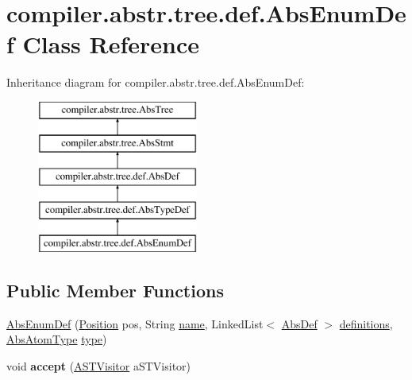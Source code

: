 \hypertarget{classcompiler_1_1abstr_1_1tree_1_1def_1_1_abs_enum_def}{}\section{compiler.\+abstr.\+tree.\+def.\+Abs\+Enum\+Def Class Reference}
\label{classcompiler_1_1abstr_1_1tree_1_1def_1_1_abs_enum_def}
Inheritance diagram for compiler.\+abstr.\+tree.\+def.\+Abs\+Enum\+Def\+:\begin{figure}[H]
\begin{center}
\leavevmode
\includegraphics[height=5.000000cm]{classcompiler_1_1abstr_1_1tree_1_1def_1_1_abs_enum_def}
\end{center}
\end{figure}
\subsection*{Public Member Functions}
\begin{DoxyCompactItemize}
\item 
\hyperlink{classcompiler_1_1abstr_1_1tree_1_1def_1_1_abs_enum_def_abe0f9c331bc6c3a3c8caf5b2162380c4}{Abs\+Enum\+Def} (\hyperlink{classcompiler_1_1_position}{Position} pos, String \hyperlink{classcompiler_1_1abstr_1_1tree_1_1def_1_1_abs_def_ac6bda9377f5abbb5f1be7d3d1b16481b}{name}, Linked\+List$<$ \hyperlink{classcompiler_1_1abstr_1_1tree_1_1def_1_1_abs_def}{Abs\+Def} $>$ \hyperlink{classcompiler_1_1abstr_1_1tree_1_1def_1_1_abs_enum_def_ab0e83a0d165a93b4acc46a36ecf0275f}{definitions}, \hyperlink{classcompiler_1_1abstr_1_1tree_1_1type_1_1_abs_atom_type}{Abs\+Atom\+Type} \hyperlink{classcompiler_1_1abstr_1_1tree_1_1def_1_1_abs_enum_def_abd37c193b2bab1d225efa0532c74d222}{type})
\item 
\mbox{\label{classcompiler_1_1abstr_1_1tree_1_1def_1_1_abs_enum_def_a48d6dbf5f4c27d238dd502b9fb4405c1}} 
void {\bfseries accept} (\hyperlink{interfacecompiler_1_1abstr_1_1_a_s_t_visitor}{A\+S\+T\+Visitor} a\+S\+T\+Visitor)
\end{DoxyCompactItemize}
